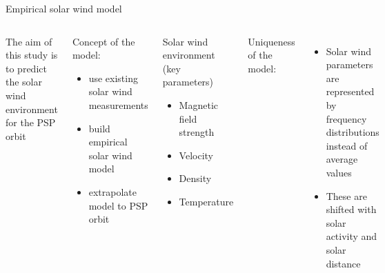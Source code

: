 \begin{frame}[plain,c]{Empirical solar wind model}{}
	\begin{columns}[c]
		
		The aim of this study is to predict the solar wind environment for the PSP orbit
		\vspace{10mm}
		\begin{block}{Concept of the model:}
			\begin{itemize}
				\item use existing solar wind measurements
				\item build empirical solar wind model
				\item extrapolate model to PSP orbit
			\end{itemize}
		\end{block}
			
		
		\begin{block}{Solar wind environment (key parameters)}
			\begin{itemize}
				\item Magnetic field strength
				\item Velocity
				\item Density
				\item Temperature
			\end{itemize}
		\end{block}
		\vspace{10mm}
		Uniqueness of the model:
		\begin{itemize}
			\item Solar wind parameters are represented by frequency distributions instead of average values
			\item These are shifted with solar activity and solar distance
		\end{itemize}
	\end{columns}
	\vspace*{\fill} \hfill \hyperlink{lognormal_distribution}{\beamerskipbutton{}}
\end{frame}

% 		
% 
% 		
% 		
% 		
% 
% 

